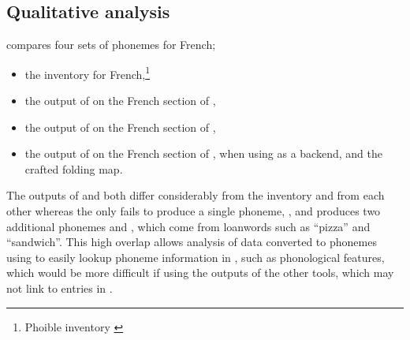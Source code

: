 



\subsection{Qualitative analysis}\label{sec:13-qualitative}


 compares four sets of phonemes for French;
\begin{itemize}
\item the \phoible inventory for French,\footnote{Phoible inventory \href{https://phoible.org/inventories/view/2269}{}}
\item the output of \phonemizer on the French section of \childes,
\item the output of \epitran on the French section of \childes,
\item the output of \gpp on the French section of \childes, when using \phonemizer as a backend, and the crafted folding map.
\end{itemize}

The outputs of \phonemizer and \epitran both differ considerably from the \phoible inventory and from each other whereas the \gpp only fails to produce a single phoneme, \textipa{\textturnh}, and produces two additional phonemes  and , which come from loanwords such as ``pizza'' and ``sandwich''. This high overlap allows analysis of data converted to phonemes using \gpp to easily lookup phoneme information in \phoible, such as phonological features, which would be more difficult if using the outputs of the other tools, which may not link to entries in \phoible.

